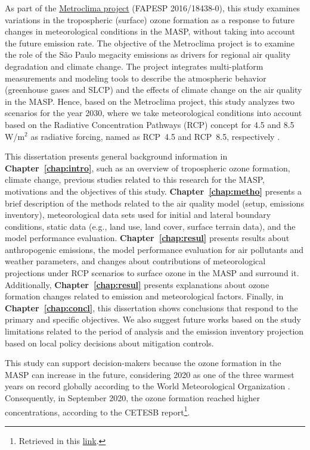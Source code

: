 As part of the \href{http://www.metroclima.iag.usp.br/}{Metroclima project} (FAPESP 2016/18438-0), this study examines variations in the tropospheric (surface) ozone formation as a response to future changes in meteorological conditions in the MASP, without taking into account the future emission rate. 
The objective of the Metroclima project is to examine the role of the S\~{a}o Paulo megacity emissions as drivers for regional air quality degradation and climate change.
The project integrates multi-platform measurements and modeling tools to describe the atmospheric behavior (greenhouse gases and SLCP) and the effects of climate change on the air quality in the MASP.
Hence, based on the Metroclima project, this study analyzes two scenarios for the year 2030, where we take meteorological conditions into account based on the Radiative Concentration Pathways (RCP) concept for 4.5 and 8.5 W/m$^2$ as radiative forcing, named as RCP~4.5 and RCP~8.5, respectively \citep{VanVuuren2011a}.

This dissertation presents general background information in \textbf{Chapter~\ref{chap:intro}}, such as an overview of tropospheric ozone formation, climate change, previous studies related to this research for the MASP, motivations and the objectives of this study.
\textbf{Chapter~\ref{chap:metho}} presents a brief description of the methods related to the air quality model (setup, emissions inventory), meteorological data sets used for initial and lateral boundary conditions, static data (e.g., land use, land cover, surface terrain data), and the model performance evaluation.
\textbf{Chapter~\ref{chap:resul}} presents results about anthropogenic emissions, the model performance evaluation for air pollutants and weather parameters, and changes about contributions of meteorological projections under RCP scenarios to surface ozone in the MASP and surround it. 
Additionally, \textbf{Chapter~\ref{chap:resul}} presents explanations about ozone formation changes related to emission and meteorological factors.
Finally, in \textbf{Chapter~\ref{chap:concl}}, this dissertation shows conclusions that respond to the primary and specific objectives.
We also suggest future works based on the study limitations related to the period of analysis and the emission inventory projection based on local policy decisions about mitigation controls.

This study can support decision-makers because the ozone formation in the MASP can increase in the future, considering 2020 as one of the three warmest years on record globally according to the World Meteorological Organization \citep{WMO2020}. Consequently, in September 2020, the ozone formation reached higher concentrations, according to the CETESB report\footnote{Retrieved in this \href{https://cetesb.sp.gov.br/ar/wp-content/uploads/sites/28/2020/11/Boletim-Mensal-da-Qualidade-do-Ar-Setembro-2020.pdf}{link}.}.


